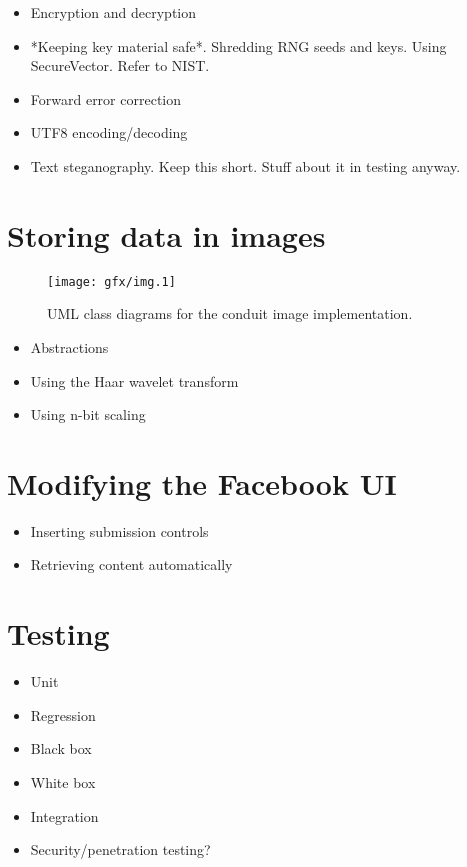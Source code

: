     \begin{itemize}
        \item Encryption and decryption
        \item *Keeping key material safe*. Shredding RNG seeds and keys. Using SecureVector. Refer to NIST.
        \item Forward error correction
        \item UTF8 encoding/decoding
        \item Text steganography. Keep this short. Stuff about it in testing anyway.
    \end{itemize}

\section{Storing data in images}

    \begin{figure}[tbp]
        \begin{center}
                \texttt{[image: gfx/img.1]}
            \caption{UML class diagrams for the conduit image implementation.}
            \label{uml:img-classes}
        \end{center}
    \end{figure}
    
    \begin{itemize}
        \item Abstractions
        \item Using the Haar wavelet transform
        \item Using n-bit scaling
    \end{itemize}



\section{Modifying the Facebook UI}
    \begin{itemize}
        \item Inserting submission controls
        \item Retrieving content automatically
    \end{itemize}

\section{Testing}
    \begin{itemize}
        \item Unit
        \item Regression
        \item Black box
        \item White box
        \item Integration
        \item Security/penetration testing?
    \end{itemize}
    

